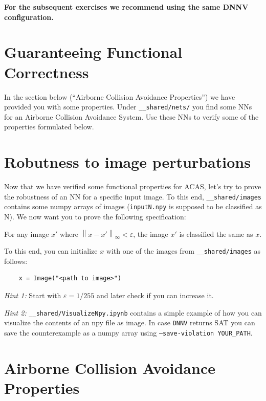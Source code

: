 \documentclass[11pt,fleqn]{article}
\begin{document}
\begin{center}
    \textbf{For the subsequent exercises we recommend using the same DNNV configuration.}
\end{center}

\section*{Guaranteeing Functional Correctness}
In the section below (``Airborne Collision Avoidance Properties'') we have provided you with some properties.
Under \texttt{\_\_shared/nets/} you find some NNs for an Airborne Collision Avoidance System.
Use these NNs to verify some of the properties formulated below.

\section*{Robutness to image perturbations}
Now that we have verified some functional properties for ACAS,
let's try to prove the robustness of an NN for a specific input image.
To this end, \texttt{\_\_shared/images} contains some numpy arrays of images
(\texttt{inputN.npy} is supposed to be classified as N).
%
We now want you to prove the following specification:
\begin{center}
    For any image $x'$ where $\left\| x - x' \right\|_{\infty} < \varepsilon$,
    the image $x'$ is classified the same as $x$.
\end{center}
To this end, you can initialize $x$ with one of the images from \texttt{\_\_shared/images}
as follows:
\begin{verbatim}
    x = Image("<path to image>")
\end{verbatim}

\textit{Hint 1:} Start with $\varepsilon=1/255$ and later check if you can increase it.

\textit{Hint 2:} \texttt{\_\_shared/VisualizeNpy.ipynb} contains a simple example of how you can visualize the contents of an npy file as image.
In case \texttt{DNNV} returns SAT you can save the counterexample as a numpy array using \texttt{--save-violation YOUR\_PATH}.



\clearpage
\section*{Airborne Collision Avoidance Properties}
\end{document}
